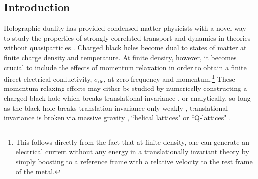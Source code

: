 \documentclass[10pt, oneside]{book}
\begin{document}
\begin{doublespace}
\section{Introduction}
Holographic duality has provided condensed matter physicists with a novel way to study the properties of strongly correlated transport and dynamics in theories without quasiparticles \cite{Hartnoll:2009sz, McGreevy:2009xe, Sachdev:2011wg}.   Charged black holes become dual to states of matter at finite charge density and temperature.    At finite density, however, it becomes crucial to include the effects of momentum relaxation in order to obtain a finite direct electrical conductivity, $\sigma_{\mathrm{dc}}$, at zero frequency and momentum.\footnote{This follows directly from the fact that at finite density, one can generate an electrical current without any energy in a translationally invariant theory by simply boosting to a reference frame with a relative velocity to the rest frame of the metal.}  These momentum relaxing effects may either be studied by numerically constructing a charged black hole which breaks translational invariance \cite{Horowitz:2012ky, Ling:2013nxa, Donos:2014yya}, or analytically, so long as the black hole breaks translation invariance only weakly \cite{Hartnoll:2012rj, Blake:2013owa, lucas1401, Lucas:2014sba}, translational invariance is broken via massive gravity \cite{Vegh:2013sk, Davison:2013jba, Blake:2013bqa, Davison:2013txa}, ``helical lattices" \cite{Donos:2012js, Donos:2014oha} or  ``Q-lattices" \cite{Donos:2013eha, Andrade:2013gsa, Gouteraux:2014hca}.  


\end{doublespace}
\end{document}
